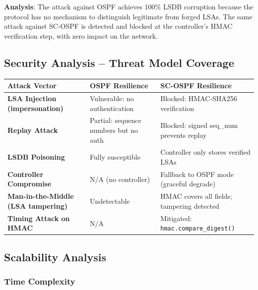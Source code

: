 \documentclass[12pt,a4paper]{article}
\begin{document}
\textbf{Analysis}: The attack against OSPF achieves 100\% LSDB corruption because
the protocol has no mechanism to distinguish legitimate from forged LSAs. The
same attack against SC-OSPF is detected and blocked at the controller's HMAC
verification step, with zero impact on the network.

\subsection{Security Analysis -- Threat Model Coverage}

\begin{center}
\begin{tabularx}{\textwidth}{>{\bfseries}lXX}
\toprule
Attack Vector & OSPF Resilience & SC-OSPF Resilience \\
\midrule
LSA Injection (impersonation) &
  \color{accentred}Vulnerable: no authentication &
  \color{accentgreen}Blocked: HMAC-SHA256 verification \\

Replay Attack &
  \color{accentred}Partial: sequence numbers but no auth &
  \color{accentgreen}Blocked: signed seq\_num prevents replay \\

LSDB Poisoning &
  \color{accentred}Fully susceptible &
  \color{accentgreen}Controller only stores verified LSAs \\

Controller Compromise &
  \color{accentgreen}N/A (no controller) &
  \color{accentorange}Fallback to OSPF mode (graceful degrade) \\

Man-in-the-Middle (LSA tampering) &
  \color{accentred}Undetectable &
  \color{accentgreen}HMAC covers all fields; tampering detected \\

Timing Attack on HMAC &
  \color{accentgreen}N/A &
  \color{accentgreen}Mitigated: \texttt{hmac.compare\_digest()} \\
\bottomrule
\end{tabularx}
\end{center}

\subsection{Scalability Analysis}

\subsubsection{Time Complexity}
\end{document}
